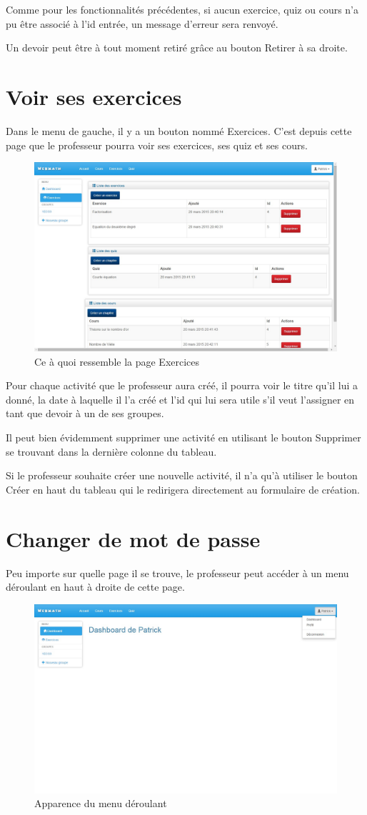 \documentclass[letterpaper,10pt,french]{sphinxmanual}
\begin{document}
Comme pour les fonctionnalités précédentes, si aucun exercice, quiz ou cours
n'a pu être associé à l'id entrée, un message d'erreur sera renvoyé.

Un devoir peut être à tout moment retiré grâce au bouton Retirer à sa droite.


\section{Voir ses exercices}
\label{dashboard:voir-ses-exercices}
Dans le menu de gauche, il y a un bouton nommé Exercices. C'est depuis cette
page que le professeur pourra voir ses exercices, ses quiz et ses cours.
\begin{figure}[htbp]
\centering
\capstart

\includegraphics[width=0.600\linewidth]{exercices.jpg}
\caption{Ce à quoi ressemble la page Exercices}\end{figure}

Pour chaque activité que le professeur aura créé, il pourra voir le titre qu'il
lui a donné, la date à laquelle il l'a créé et l'id qui lui sera utile s'il veut
l'assigner en tant que devoir à un de ses groupes.

Il peut bien évidemment supprimer une activité en utilisant le bouton Supprimer
se trouvant dans la dernière colonne du tableau.

Si le professeur souhaite créer une nouvelle activité, il n'a qu'à utiliser le
bouton Créer en haut du tableau qui le redirigera directement au formulaire de
création.


\section{Changer de mot de passe}
\label{dashboard:changer-de-mot-de-passe}
Peu importe sur quelle page il se trouve, le professeur peut accéder à un menu
déroulant en haut à droite de cette page.
\begin{figure}[htbp]
\centering
\capstart

\includegraphics[width=0.600\linewidth]{menuDeroulant.jpg}
\caption{Apparence du menu déroulant}\end{figure}
\end{document}
